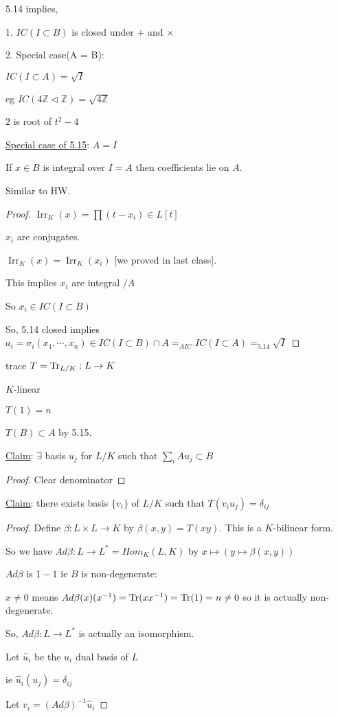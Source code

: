 \documentclass{article}
\theoremstyle{definition}
\begin{document}
5.14 implies,

1. \(IC(I \subset B)\) is closed under \(+\) and \(\times\)

2. Special case(A = B):

\(IC(I \subset A) = \sqrt{I}\)

eg \(IC(4\mathbb{Z} \triangleleft \mathbb{Z})= \sqrt{4\mathbb{Z}} \)

\(2\) is root of \(t^2 - 4\) 

\underline{Special case of 5.15}: \(A = I\) 

If \(x\in B\) is integral over \(I=A\) then coefficients lie on \(A\).

Similar to HW.

\begin{proof}
    \(\operatorname{Ir r}_K(x) = \prod (t-x_i)\in L[t]\)
    
    \(x_i\) are conjugates.

    \(\operatorname{Ir r}_K(x)=\operatorname{Ir r}_K(x_i) \) [we proved in last class].

    This implies \(x_i\) are integral \(/A\) 

    So \(x_i\in IC(I \subset B)\)
    
    So, 5.14 closed implies \(a_i = \sigma _i(x_1,\cdots,x_n)\in IC(I \subset B)\cap A =_{AIC} IC(I \subset A) =_{5.14} \sqrt{I} \) 
      
\end{proof}

trace \(T = \operatorname{Tr}_{L / K} : L \to K\)

\(K\)-linear

\(T(1)=n\)

\(T(B) \subset A\) by 5.15.

\underline{Claim}: \(\exists\) basis \(u_j\) for \(L / K\) such that \(\sum_{i} A u_j \subset B\)

\begin{proof}
    Clear denominator
\end{proof}

\underline{Claim}: there exists basis \(\{ v_i \} \) of \(L / K\) such that \(T(v_i u_j) = \delta _{i j}\)

\begin{proof}
    Define \(\beta : L \times L \to K\) by \(\beta(x,y) = T(xy)\). This is a \(K\)-bilinear form.
    
    So we have \(Ad \beta : L \to L^{\ast} = Hom_K(L,K)\) by \(x \mapsto (y \mapsto \beta(x,y))\)  

    \(Ad \beta \) is \(1-1\) ie \(B\) is non-degenerate:
    
    \(x\neq 0\) means \(Ad \beta (x)(x ^{-1}) = \operatorname{Tr}(x x ^{-1}) = \operatorname{Tr} (1) = n\neq 0\) so it is actually non-degenerate.
    
    So, \(Ad \beta : L \to L^{\ast}\) is actually an isomorphism.
    
    Let \(\hat{u} _i\) be the \(u_i\) dual basis of \(L\) 
    
    ie \(\hat{u}_i (u_j) = \delta_{i j}\) 

    Let \(v_i = (Ad \beta) ^{-1} \hat{u}_i\) 
\end{proof}
\end{document}

